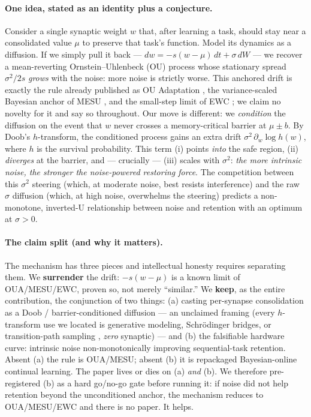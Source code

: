 \documentclass[11pt]{article}
\newcommand{\wmu}{(w-\mu)}
\begin{document}
\paragraph{One idea, stated as an identity plus a conjecture.}
Consider a single synaptic weight $w$ that, after learning a task, should stay near
a consolidated value $\mu$ to preserve that task's function. Model its dynamics as
a diffusion. If we simply pull it back --- $dw=-s\wmu\,dt+\sigma\,dW$ --- we recover
a mean-reverting Ornstein--Uhlenbeck (OU) process whose stationary spread
$\sigma^2/2s$ \emph{grows} with the noise: more noise is strictly worse. This
anchored drift is exactly the rule already published as OU Adaptation
\citep{oua2024}, the variance-scaled Bayesian anchor of MESU \citep{mesu2025}, and
the small-step limit of EWC \citep{ewc2017}; we claim no novelty for it and say so
throughout. Our move is different: we \emph{condition} the diffusion on the event
that $w$ never crosses a memory-critical barrier at $\mu\pm b$. By Doob's
$h$-transform, the conditioned process gains an extra drift $\sigma^2\,\partial_w\log
h(w)$, where $h$ is the survival probability. This term (i) points \emph{into} the
safe region, (ii) \emph{diverges} at the barrier, and --- crucially --- (iii)
scales with $\sigma^2$: \emph{the more intrinsic noise, the stronger the
noise-powered restoring force}. The competition between this $\sigma^2$ steering
(which, at moderate noise, best resists interference) and the raw $\sigma$ diffusion
(which, at high noise, overwhelms the steering) predicts a non-monotone, inverted-U
relationship between noise and retention with an optimum at $\sigma>0$.

\paragraph{The claim split (and why it matters).}
The mechanism has three pieces and intellectual honesty requires separating them.
We \textbf{surrender} the drift: $-s\wmu$ is a known limit of OUA/MESU/EWC, proven
so, not merely ``similar.'' We \textbf{keep}, as the entire contribution, the
conjunction of two things: (a) casting per-synapse consolidation as a Doob /
barrier-conditioned diffusion --- an unclaimed framing (every $h$-transform use we
located is generative modeling, Schr\"odinger bridges, or transition-path sampling
\citep{doobslagrangian2025,hedit2025,reflectedsb2024}, \emph{zero} synaptic) --- and
(b) the falsifiable hardware curve: intrinsic noise non-monotonically improving
sequential-task retention. Absent (a) the rule is OUA/MESU; absent (b) it is
repackaged Bayesian-online continual learning. The paper lives or dies on (a)
\emph{and} (b). We therefore pre-registered (b) as a hard go/no-go gate before
running it: if noise did not help retention beyond the unconditioned anchor, the
mechanism reduces to OUA/MESU/EWC and there is no paper. It helps.
\end{document}
